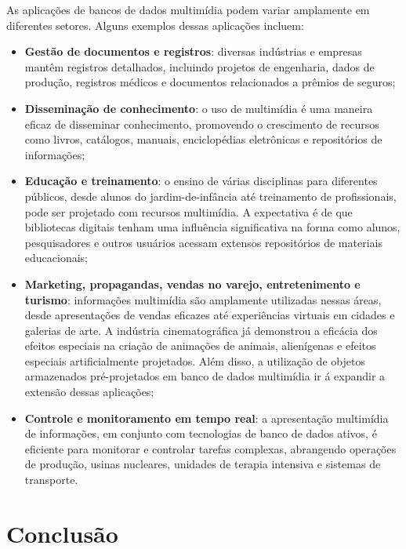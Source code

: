 \documentclass[12pt]{article}
\begin{document}
	As aplicações de bancos de dados multimídia podem variar amplamente em diferentes setores. Alguns exemplos dessas aplicações incluem:
	
	\begin{itemize}
		
		\item \textbf{Gestão de documentos e registros}: diversas indústrias e empresas mantêm registros detalhados, incluindo projetos de engenharia, dados de produção, registros médicos e documentos relacionados a prêmios de seguros;
		
		\item \textbf{Disseminação de conhecimento}: o uso de multimídia é uma maneira eficaz de disseminar conhecimento, promovendo o crescimento de recursos como livros, catálogos, manuais, enciclopédias eletrônicas e repositórios de informações;
		
		\item \textbf{Educação e treinamento}: o ensino de várias disciplinas para diferentes públicos, desde alunos do jardim-de-infância até treinamento de profissionais, pode ser projetado com recursos multimídia. A expectativa é de que bibliotecas digitais tenham uma influência significativa na forma como alunos, pesquisadores e outros usuários acessam extensos repositórios de materiais educacionais;
		
		\item \textbf{Marketing, propagandas, vendas no varejo, entretenimento e turismo}: informações multimídia são amplamente utilizadas nessas áreas, desde apresentações de vendas eficazes até experiências virtuais em cidades e galerias de arte. A indústria cinematográfica já demonstrou a eficácia dos efeitos especiais na criação de animações de animais, alienígenas e efeitos especiais artificialmente projetados. Além disso, a utilização de objetos armazenados pré-projetados em banco de dados multimídia ir á expandir a extensão dessas aplicações;
		
		\item \textbf{Controle e monitoramento em tempo real}: a apresentação multimídia de informações, em conjunto com tecnologias de banco de dados ativos, é eficiente para monitorar e controlar tarefas complexas, abrangendo operações de produção, usinas nucleares, unidades de terapia intensiva e sistemas de transporte.
		
	\end{itemize}
	
	\section{Conclusão}
	
\end{document}
